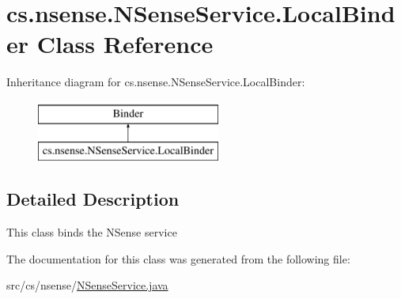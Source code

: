 \hypertarget{classcs_1_1nsense_1_1_n_sense_service_1_1_local_binder}{\section{cs.\-nsense.\-N\-Sense\-Service.\-Local\-Binder Class Reference}
\label{classcs_1_1nsense_1_1_n_sense_service_1_1_local_binder}
}
Inheritance diagram for cs.\-nsense.\-N\-Sense\-Service.\-Local\-Binder\-:\begin{figure}[H]
\begin{center}
\leavevmode
\includegraphics[height=2.000000cm]{classcs_1_1nsense_1_1_n_sense_service_1_1_local_binder}
\end{center}
\end{figure}


\subsection{Detailed Description}
This class binds the N\-Sense service 

The documentation for this class was generated from the following file\-:\begin{DoxyCompactItemize}
\item 
src/cs/nsense/\hyperlink{_n_sense_service_8java}{N\-Sense\-Service.\-java}\end{DoxyCompactItemize}
